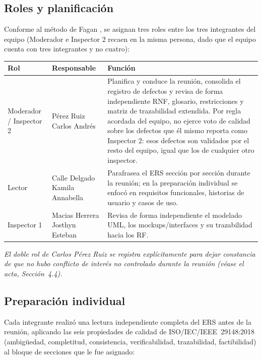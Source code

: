 \documentclass[11pt,a4paper]{article}
\begin{document}
\subsection{Roles y planificación}
Conforme al método de Fagan \cite{fagan1976inspections}, se asignan tres roles entre los tres integrantes del equipo (Moderador e Inspector 2 recaen en la misma persona, dado que el equipo cuenta con tres integrantes y no cuatro):

\begin{longtable}{|p{3.5cm}|p{4cm}|p{6cm}|}
\hline
\textbf{Rol} & \textbf{Responsable} & \textbf{Función} \\
\hline
Moderador / Inspector 2 & Pérez Ruiz Carlos Andrés & Planifica y conduce la reunión, consolida el registro de defectos y revisa de forma independiente RNF, glosario, restricciones y matriz de trazabilidad extendida. Por regla acordada del equipo, no ejerce voto de calidad sobre los defectos que él mismo reporta como Inspector 2: esos defectos son validados por el resto del equipo, igual que los de cualquier otro inspector. \\
\hline
Lector & Calle Delgado Kamila Annabella & Parafrasea el ERS sección por sección durante la reunión; en la preparación individual se enfocó en requisitos funcionales, historias de usuario y casos de uso. \\
\hline
Inspector 1 & Macias Herrera Josthyn Esteban & Revisa de forma independiente el modelado UML, los mockups/interfaces y su trazabilidad hacia los RF. \\
\hline
\end{longtable}
\vspace{-0.3cm}
\textit{El doble rol de Carlos Pérez Ruiz se registra explícitamente para dejar constancia de que no hubo conflicto de interés no controlado durante la reunión (véase el acta, Sección~4.4).}

\subsection{Preparación individual}
Cada integrante realizó una lectura independiente completa del ERS antes de la reunión, aplicando las seis propiedades de calidad de ISO/IEC/IEEE~29148:2018 \cite{iso29148} (ambigüedad, completitud, consistencia, verificabilidad, trazabilidad, factibilidad) al bloque de secciones que le fue asignado:
\end{document}
